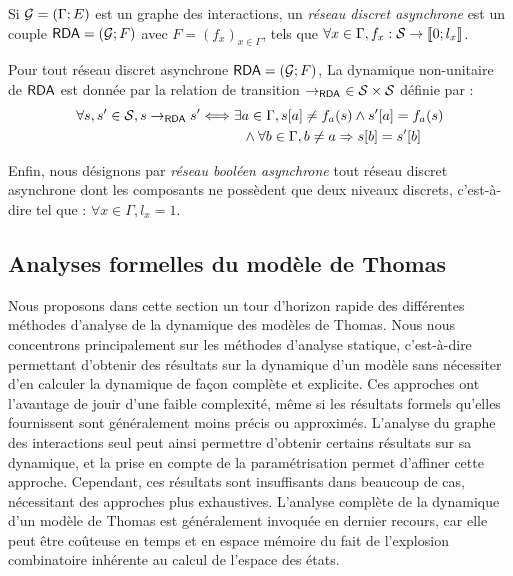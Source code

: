 \begin{definition}
  Si $\mathcal{G} = (\Gamma; E)$ est un graphe des interactions,
  un \emph{réseau discret asynchrone} est un couple $\mathsf{RDA} = (\mathcal{G}; F)$
  avec $F = (f_x)_{x \in \Gamma}$, tels que
  $\forall x \in \Gamma, f_x : \mathcal{S} \rightarrow \mathopen{\llbracket}0\mathclose{};l_x\mathclose{\rrbracket}$.
\end{definition}

\begin{definition}
  Pour tout réseau discret asynchrone $\mathsf{RDA} = (\mathcal{G}; F)$,
  La dynamique non-unitaire de $\mathsf{RDA}$ est donnée par la relation de transition
  $\rightarrow_{\mathsf{RDA}}\ \in \mathcal{S} \times \mathcal{S}$ définie par :
  \begin{align*}
    \forall s, s' \in \mathcal{S}, s \rightarrow_{\mathsf{RDA}} s'
      &\Longleftrightarrow \exists a \in \Gamma,
    {s[a]} \neq f_a(s) \wedge
      {s'[a]} = f_a(s) \\
      &\qquad\quad \wedge \forall b \in \Gamma, b \neq a \Rightarrow {s[b]} = {s'[b]}
  \end{align*}
\end{definition}

Enfin, nous désignons par \emph{réseau booléen asynchrone}
tout réseau discret asynchrone dont les composants ne possèdent que deux niveaux discrets,
c'est-à-dire tel que : $\forall x \in \Gamma, l_x = 1$.



\subsection{Analyses formelles du modèle de Thomas}

Nous proposons dans cette section un tour d'horizon rapide des différentes méthodes
d'analyse de la dynamique des modèles de Thomas.
Nous nous concentrons principalement sur les méthodes d'analyse statique,
c'est-à-dire permettant d'obtenir des résultats sur la dynamique d'un modèle
sans nécessiter d'en calculer la dynamique de façon complète et explicite.
Ces approches ont l'avantage de jouir d'une faible complexité, même si les résultats formels
qu'elles fournissent sont généralement moins précis ou approximés.
L'analyse du graphe des interactions seul peut ainsi permettre d'obtenir certains
résultats sur sa dynamique,
et la prise en compte de la paramétrisation permet d'affiner cette approche.
Cependant, ces résultats sont insuffisants dans beaucoup de cas,
nécessitant des approches plus exhaustives.
L'analyse complète de la dynamique d'un modèle de Thomas
est généralement invoquée en dernier recours, car elle peut être coûteuse en temps
et en espace mémoire du fait de l'explosion combinatoire inhérente au calcul
de l'espace des états.

